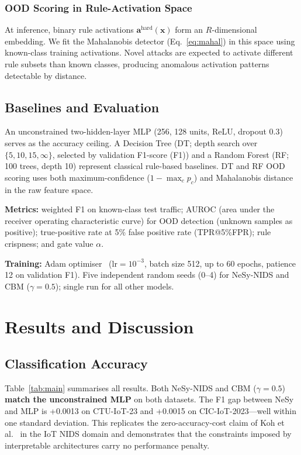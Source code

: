 \documentclass[conference]{IEEEtran}
\begin{document}
\subsubsection{OOD Scoring in Rule-Activation Space}

At inference, binary rule activations $\mathbf{a}^{\mathrm{hard}}(\mathbf{x})$
form an $R$-dimensional embedding.
We fit the Mahalanobis detector (Eq.~\ref{eq:mahal}) in this space using
known-class training activations.
Novel attacks are expected to activate different rule subsets than known
classes, producing anomalous activation patterns detectable by distance.

\subsection{Baselines and Evaluation}

An unconstrained two-hidden-layer MLP (256, 128 units, ReLU, dropout 0.3)
serves as the accuracy ceiling.
A Decision Tree (DT; depth search over $\{5,10,15,\infty\}$, selected by
validation F1-score (F1)) and a Random Forest (RF;~\cite{breiman2001random}
100 trees, depth 10) represent classical rule-based baselines.
DT and RF OOD scoring uses both maximum-confidence ($1{-}\max_c p_c$) and
Mahalanobis distance in the raw feature space.

\textbf{Metrics:} weighted F1 on known-class test traffic;
AUROC (area under the receiver operating characteristic curve) for OOD
detection (unknown samples as positive); true-positive rate at 5\% false
positive rate (TPR@5\%FPR); rule crispness; and gate value $\alpha$.

\textbf{Training:} Adam optimiser~\cite{kingma2014adam}
($\mathrm{lr}{=}10^{-3}$, batch size 512, up to 60 epochs, patience 12
on validation F1).
Five independent random seeds (0--4) for NeSy-NIDS and CBM ($\gamma{=}0.5$);
single run for all other models.

\section{Results and Discussion}

\subsection{Classification Accuracy}

Table~\ref{tab:main} summarises all results.
Both NeSy-NIDS and CBM ($\gamma{=}0.5$) \textbf{match the unconstrained MLP}
on both datasets.
The F1 gap between NeSy and MLP is +0.0013 on CTU-IoT-23 and +0.0015 on
CIC-IoT-2023---well within one standard deviation.
This replicates the zero-accuracy-cost claim of Koh et al.~\cite{koh2020concept}
in the IoT NIDS domain and demonstrates that the constraints imposed by
interpretable architectures carry no performance penalty.
\end{document}
